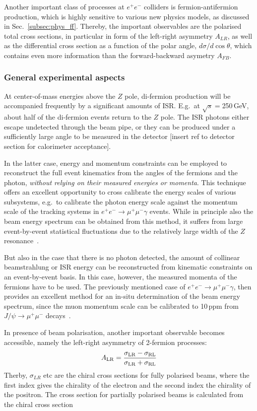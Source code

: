 Another important class of processes at $e^+e^-$ colliders is fermion-antifermion production, which is highly sensitive to various new physics models, as discussed in Sec.~\ref{subsec:phys_ff}. Thereby, the important observables are the polarised total cross sections, in particular in form of the left-right asymmetry $A_{LR}$, as well as the differential cross section as a function of the polar angle, $d\sigma/d \cos{\theta}$, which contains even more information than the forward-backward asymetry $A_{FB}$.

\subsubsection{General experimental aspects}

At center-of-mass energies above the $Z$ pole, di-fermion production will be accompanied frequently by a significant amounts of ISR. E.g.\ at $\sqrt{s}=$250\,GeV, about half of the di-fermion events return to the $Z$ pole. The ISR photons either escape undetected through the beam pipe, or they can be produced under a sufficiently large angle to be measured in the detector {\color{red} [insert ref to detector section for calorimeter acceptance]}.

In the latter case, energy and momentum constraints can be employed to reconstruct the full event kinematics from the angles of the fermions and the photon, {\em without relying on their measured energies or momenta}. This technique offers an excellent opportunity to cross calibrate the energy scales of various subsystems, e.g.\ to calibrate the photon energy scale against the momentum scale of the tracking systems in $e^+e^- \to \mu^+\mu^-\gamma $ events. While in principle also the beam energy spectrum can be obtained from this method, it suffers from large event-by-event statistical fluctuations due to the relatively large width of the $Z$ resonance~\cite{Wilson:2016hne}.

But also in the case that there is no photon detected, the amount of collinear beamstrahlung or ISR energy can be reconstructed from kinematic constraints on an event-by-event basis. In this case, however, the measured momenta of the fermions have to be used. The previously mentioned case of $e^+e^- \to \mu^+\mu^-\gamma $, then provides an excellent method for an in-situ determination of the beam energy spectrum, since the muon momentum scale can be calibrated to 10\,ppm from $J/\psi \to \mu^+\mu^-$ decays~\cite{Wilson:2016hne}.

In presence of beam polarisation, another important observable becomes accessible, namely the left-right asymmetry of 2-fermion processes:
\begin{equation}
A_{\mathrm{LR}} = \frac{\sigma_{\mathrm{LR}}-\sigma_{\mathrm{RL}}}{\sigma_{\mathrm{LR}}+\sigma_{\mathrm{RL}}}
\label{eq:defALR}
\end{equation}
Therby, $\sigma_{LR}$ etc are the chiral cross sections for fully polarised beams, where the first index gives the chirality of the electron and the second index the chirality of the positron.
The cross section for partially polarised beams is calculated from the chiral cross section 

